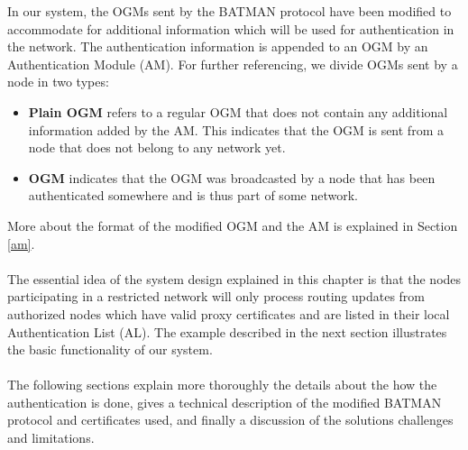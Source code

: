 \noindent
In our system, the OGMs sent by the BATMAN protocol have been modified to accommodate for additional information which will be used for authentication in the network. The authentication information is appended to an OGM by an Authentication Module (AM). For further referencing, we divide OGMs sent by a node in two types:
\begin{itemize}
\item \textbf{Plain OGM} refers to a regular OGM that does not contain any additional information added by the AM. This indicates that the OGM is sent from a node that does not belong to any network yet.

\item \textbf{OGM} indicates that the OGM was broadcasted by a node that has been authenticated somewhere and is thus part of some network.
\end{itemize}

\noindent
More about the format of the modified OGM and the AM is explained in Section \ref{am}.
\\\\
The essential idea of the system design explained in this chapter is that the nodes participating in a restricted network will only process routing updates from authorized nodes which have valid proxy certificates and are listed in their local Authentication List (AL). The example described in the next section illustrates the basic functionality of our system. 
\\\\
The following sections explain more thoroughly the details about the how the authentication is done, gives a technical description of the modified BATMAN protocol and certificates used, and finally a discussion of the solutions challenges and limitations.

